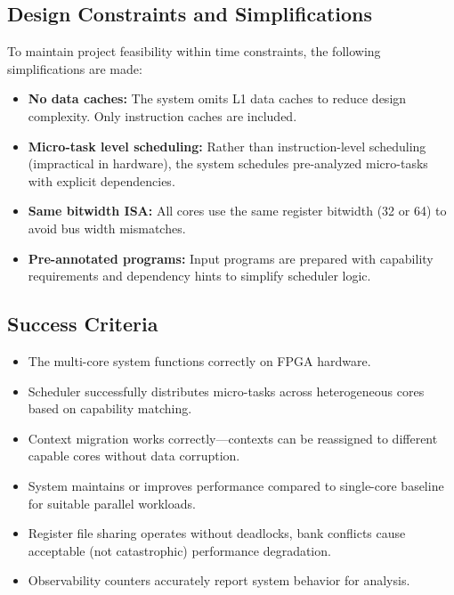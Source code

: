 \documentclass[12pt,letterpaper]{report}
\theoremstyle{definition}
\theoremstyle{plain}
\begin{document}
\subsection{Design Constraints and Simplifications}
To maintain project feasibility within time constraints, the following simplifications 
are made:
\begin{itemize}
    \item \textbf{No data caches:} The system omits L1 data caches to reduce design 
          complexity. Only instruction caches are included.
    \item \textbf{Micro-task level scheduling:} Rather than instruction-level scheduling 
          (impractical in hardware), the system schedules pre-analyzed micro-tasks with 
          explicit dependencies.
    \item \textbf{Same bitwidth ISA:} All cores use the same register bitwidth (32 or 64) 
          to avoid bus width mismatches.
    \item \textbf{Pre-annotated programs:} Input programs are prepared with capability 
          requirements and dependency hints to simplify scheduler logic.
\end{itemize}

\subsection{Success Criteria}
\begin{specbox}[title=Functional Requirements]
\begin{itemize}
    \item The multi-core system functions correctly on FPGA hardware.
    \item Scheduler successfully distributes micro-tasks across heterogeneous cores 
          based on capability matching.
    \item Context migration works correctly—contexts can be reassigned to different 
          capable cores without data corruption.
    \item System maintains or improves performance compared to single-core baseline 
          for suitable parallel workloads.
    \item Register file sharing operates without deadlocks, bank conflicts cause 
          acceptable (not catastrophic) performance degradation.
    \item Observability counters accurately report system behavior for analysis.
\end{itemize}
\end{specbox}
\end{document}
